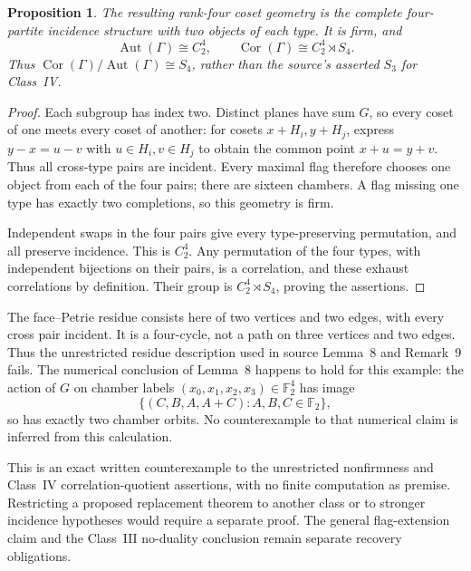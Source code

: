 \documentclass[11pt,a4paper]{article}
\newtheorem{proposition}{Proposition}
\begin{document}
\begin{proposition}
The resulting rank-four coset geometry is the complete four-partite
incidence structure with two objects of each type. It is firm, and
\[
 \operatorname{Aut}(\Gamma)\cong C_2^4,
 \qquad \operatorname{Cor}(\Gamma)\cong C_2^4\rtimes S_4.
\]
Thus $\operatorname{Cor}(\Gamma)/\operatorname{Aut}(\Gamma)\cong S_4$,
rather than the source's asserted $S_3$ for Class~IV.
\end{proposition}
\begin{proof}
Each subgroup has index two. Distinct planes have sum $G$, so every coset
of one meets every coset of another: for cosets $x+H_i,y+H_j$, express
$y-x=u-v$ with $u\in H_i,v\in H_j$ to obtain the common point
$x+u=y+v$. Thus all cross-type pairs are incident. Every maximal flag
therefore chooses one object from each of the four pairs; there are
sixteen chambers. A flag missing one type has exactly two completions,
so this geometry is firm.

Independent swaps in the four pairs give every type-preserving
permutation, and all preserve incidence. This is $C_2^4$.
Any permutation of the four types, with independent bijections on their
pairs, is a correlation, and these exhaust correlations by definition.
Their group is $C_2^4\rtimes S_4$, proving the assertions.
\end{proof}
The face--Petrie residue consists here of two vertices and two edges,
with every cross pair incident. It is a four-cycle, not a path on three
vertices and two edges. Thus the unrestricted residue description used
in source Lemma~8 and Remark~9 fails. The numerical conclusion of
Lemma~8 happens to hold for this example: the action of $G$ on chamber
labels $(x_0,x_1,x_2,x_3)\in\mathbb F_2^4$ has image
\[
 \{(C,B,A,A+C):A,B,C\in\mathbb F_2\},
\]
so has exactly two chamber orbits. No counterexample to that numerical
claim is inferred from this calculation.

This is an exact written counterexample to the unrestricted nonfirmness
and Class~IV correlation-quotient assertions, with no finite computation
as premise. Restricting a proposed replacement theorem to another class
or to stronger incidence hypotheses would require a separate proof.
The general flag-extension claim and the Class~III no-duality conclusion
remain separate recovery obligations.
\end{document}
